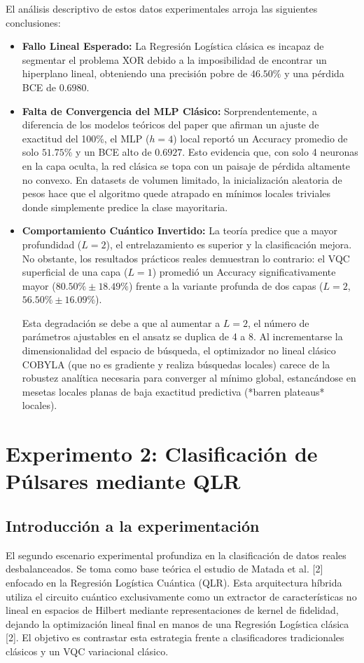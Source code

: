 \documentclass[12pt,oneside]{report}
\begin{document}
El análisis descriptivo de estos datos experimentales arroja las siguientes conclusiones:
\begin{itemize}
    \item \textbf{Fallo Lineal Esperado:} La Regresión Logística clásica es incapaz de segmentar el problema XOR debido a la imposibilidad de encontrar un hiperplano lineal, obteniendo una precisión pobre de $46.50\%$ y una pérdida BCE de $0.6980$.
    \item \textbf{Falta de Convergencia del MLP Clásico:} Sorprendentemente, a diferencia de los modelos teóricos del paper que afirman un ajuste de exactitud del 100\%, el MLP ($h=4$) local reportó un Accuracy promedio de solo $51.75\%$ y un BCE alto de $0.6927$. Esto evidencia que, con solo 4 neuronas en la capa oculta, la red clásica se topa con un paisaje de pérdida altamente no convexo. En datasets de volumen limitado, la inicialización aleatoria de pesos hace que el algoritmo quede atrapado en mínimos locales triviales donde simplemente predice la clase mayoritaria.
    \item \textbf{Comportamiento Cuántico Invertido:} La teoría predice que a mayor profundidad ($L=2$), el entrelazamiento es superior y la clasificación mejora. No obstante, los resultados prácticos reales demuestran lo contrario: el VQC superficial de una capa ($L=1$) promedió un Accuracy significativamente mayor ($80.50\% \pm 18.49\%$) frente a la variante profunda de dos capas ($L=2$, $56.50\% \pm 16.09\%$).
    
    Esta degradación se debe a que al aumentar a $L=2$, el número de parámetros ajustables en el ansatz se duplica de 4 a 8. Al incrementarse la dimensionalidad del espacio de búsqueda, el optimizador no lineal clásico COBYLA (que no es gradiente y realiza búsquedas locales) carece de la robustez analítica necesaria para converger al mínimo global, estancándose en mesetas locales planas de baja exactitud predictiva (*barren plateaus* locales).
\end{itemize}

\section{Experimento 2: Clasificación de Púlsares mediante QLR}

\subsection{Introducción a la experimentación}
El segundo escenario experimental profundiza en la clasificación de datos reales desbalanceados. Se toma como base teórica el estudio de Matada et al. [2] enfocado en la Regresión Logística Cuántica (QLR). Esta arquitectura híbrida utiliza el circuito cuántico exclusivamente como un extractor de características no lineal en espacios de Hilbert mediante representaciones de kernel de fidelidad, dejando la optimización lineal final en manos de una Regresión Logística clásica [2]. El objetivo es contrastar esta estrategia frente a clasificadores tradicionales clásicos y un VQC variacional clásico.
\end{document}
